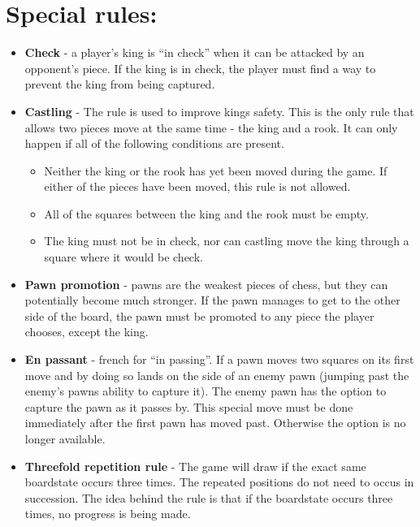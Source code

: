 \documentclass{article}
\begin{document}
\section{Special rules:}
\begin{itemize}

\item \textbf{Check} - a player’s king is “in check” when it can be attacked by an opponent’s piece. If the king is in check, the player must find a way to prevent the king from being captured.

\item \textbf{Castling} - The rule is used to improve kings safety.  This is the only rule that allows two pieces move at the same time - the king and a rook. It can only happen if all of the following conditions are present.

\begin{itemize}
   \item Neither the king or the rook has yet been moved during the game. If either of the pieces have been moved, this rule is not allowed. 
   \item All of the squares between the king and the rook must be empty.
   \item The king must not be in check, nor can castling move the king through a square where it would be check. 
   \end{itemize}

\item \textbf{Pawn promotion} - pawns are the weakest pieces of chess, but they can potentially become much stronger. If the pawn manages to get to the other side of the board, the pawn must be promoted to any piece the player chooses, except the king. 

\item \textbf{En passant} - french for “in passing”. If a pawn moves two squares on its first move and by doing so lands on the side of an enemy pawn (jumping past the enemy’s pawns ability to capture it). The enemy pawn has the option to capture the pawn as it passes by. This special move must be done immediately after the first pawn has moved past. Otherwise the option is no longer available. 

\item \textbf{Threefold repetition rule} - The game will draw if the exact same boardstate occurs three times. The repeated
positions do not need to occus in succession. The idea behind the rule is that if the boardstate occurs three times, no progress
is being made. 
\end{itemize}
\end{document}
